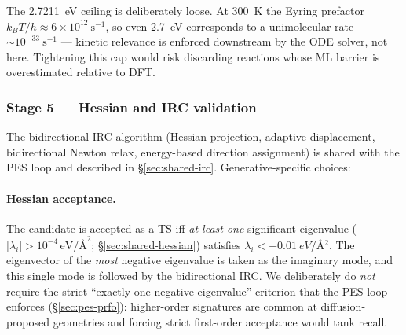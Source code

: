 The \SI{2.7211}{eV} ceiling is deliberately loose. At \SI{300}{K} the Eyring prefactor $k_B T/h \approx 6 \times 10^{12}\ \text{s}^{-1}$, so even \SI{2.7}{eV} corresponds to a unimolecular rate $\sim 10^{-33}\ \text{s}^{-1}$ --- kinetic relevance is enforced downstream by the ODE solver, not here. Tightening this cap would risk discarding reactions whose ML barrier is overestimated relative to DFT.


\subsubsection{Stage 5 --- Hessian and IRC validation}
\label{sec:hessian-irc}

The bidirectional IRC algorithm (Hessian projection, adaptive displacement, bidirectional Newton relax, energy-based direction assignment) is shared with the PES loop and described in \S\ref{sec:shared-irc}. Generative-specific choices:

\paragraph{Hessian acceptance.}
The candidate is accepted as a TS iff \emph{at least one} significant eigenvalue ($|\lambda_i| > 10^{-4}\,\text{eV/\AA}^2$; \S\ref{sec:shared-hessian}) satisfies $\lambda_i < \SI{-0.01}{eV/\angstrom^2}$. The eigenvector of the \emph{most} negative eigenvalue is taken as the imaginary mode, and this single mode is followed by the bidirectional IRC. We deliberately do \emph{not} require the strict ``exactly one negative eigenvalue'' criterion that the PES loop enforces (\S\ref{sec:pes-prfo}): higher-order signatures are common at diffusion-proposed geometries and forcing strict first-order acceptance would tank recall.

